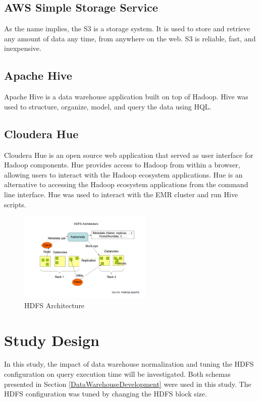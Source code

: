 \documentclass[journal]{IEEEtran}
\begin{document}
\subsection{AWS Simple Storage Service}

As the name implies, the S3 is a storage system.
It is used to store and retrieve any amount of data any time, from anywhere on the web. 
S3 is reliable, fast, and inexpensive.

\subsection{Apache Hive}

Apache Hive is a data warehouse application built on top of Hadoop. 
Hive was used to structure, organize, model, and query the data using HQL.

\subsection{Cloudera Hue}

Cloudera Hue is an open source web application that served as user interface for Hadoop components.
Hue provides access to Hadoop from within a browser, allowing users to interact with the Hadoop ecosystem applications. 
Hue is an alternative to accessing the Hadoop ecosystem applications from the command line interface.
Hue was used to interact with the EMR cluster and run Hive scripts.

\begin{figure}
    \centering
    \includegraphics[width=2.5in]{HDFS_Arch.png}
    \caption{HDFS Architecture \cite{HDFS}}
    \label{HDFS}
\end{figure}

\section{Study Design}

In this study, the impact of data warehouse normalization and
 tuning the HDFS configuration on query execution time will be investigated.
Both schemas presented in Section \ref{DataWarehouseDevelopment} were used in this study.
The HDFS configuration was tuned by changing the HDFS block size.
\end{document}

